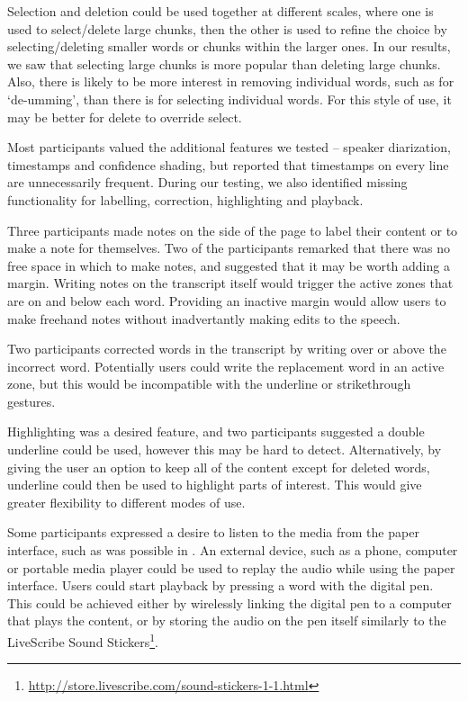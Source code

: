 Selection and deletion could be used together at different scales, where one is used to select/delete large chunks,
then the other is used to refine the choice by selecting/deleting smaller words or chunks within the larger ones. In
our results, we saw that selecting large chunks is more popular than deleting large chunks. Also, there is likely to be
more interest in removing individual words, such as for `de-umming', than there is for selecting individual words. For
this style of use, it may be better for delete to override select.

Most participants valued the additional features we tested -- speaker diarization, timestamps and confidence shading,
but reported that timestamps on every line are unnecessarily frequent. During our testing, we also identified missing
functionality for labelling, correction, highlighting and playback.


Three participants made notes on the side of the page to label their content or to make a note for themselves. Two of
the participants remarked that there was no free space in which to make notes, and suggested that it may be worth
adding a margin. Writing notes on the transcript itself would trigger the active zones that are on and below each word.
Providing an inactive margin would allow users to make freehand notes without inadvertantly making edits to the speech.

Two participants corrected words in the transcript by writing over or above the incorrect word. 
Potentially users could write the replacement word in an active zone, but this would be incompatible with the underline
or strikethrough gestures.

Highlighting was a desired feature, and two participants suggested a double underline could be used, however this may
be hard to detect. Alternatively, by giving the user an option to keep all of the content except for deleted words,
underline could then be used to highlight parts of interest.  This would give greater flexibility to different modes of
use.

Some participants expressed a desire to listen to the media from the paper interface, such as was possible in
\citet{Fouse2011}.  An external device, such as a phone, computer or portable media player could be used to replay the
audio while using the paper interface.  Users could start playback by pressing a word with the digital pen. This could
be achieved either by wirelessly linking the digital pen to a computer that plays the content, or by storing the audio
on the pen itself similarly to the LiveScribe Sound
Stickers\footnote{\url{http://store.livescribe.com/sound-stickers-1-1.html}}.

